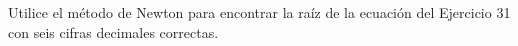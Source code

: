 \item Utilice el método de Newton para encontrar la raíz de la ecuación del Ejercicio 31 con seis cifras decimales correctas.
